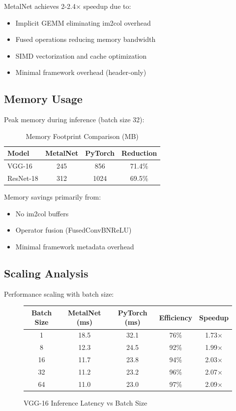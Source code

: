 \documentclass[12pt,oneside,a4paper]{report}
\begin{document}
MetalNet achieves 2-2.4× speedup due to:
\begin{itemize}
    \item Implicit GEMM eliminating im2col overhead
    \item Fused operations reducing memory bandwidth
    \item SIMD vectorization and cache optimization
    \item Minimal framework overhead (header-only)
\end{itemize}

\subsection{Memory Usage}

Peak memory during inference (batch size 32):

\begin{table}[H]
\centering
\caption{Memory Footprint Comparison (MB)}
\begin{tabular}{|l|c|c|c|}
\hline
\textbf{Model} & \textbf{MetalNet} & \textbf{PyTorch} & \textbf{Reduction} \\
\hline
VGG-16 & 245 & 856 & 71.4\% \\
\hline
ResNet-18 & 312 & 1024 & 69.5\% \\
\hline
\end{tabular}
\end{table}

Memory savings primarily from:
\begin{itemize}
    \item No im2col buffers
    \item Operator fusion (FusedConvBNReLU)
    \item Minimal framework metadata overhead
\end{itemize}

\subsection{Scaling Analysis}

Performance scaling with batch size:

\begin{figure}[H]
\centering
\begin{tabular}{|c|c|c|c|c|}
\hline
\textbf{Batch Size} & \textbf{MetalNet (ms)} & \textbf{PyTorch (ms)} & \textbf{Efficiency} & \textbf{Speedup} \\
\hline
1 & 18.5 & 32.1 & 76\% & 1.73× \\
\hline
8 & 12.3 & 24.5 & 92\% & 1.99× \\
\hline
16 & 11.7 & 23.8 & 94\% & 2.03× \\
\hline
32 & 11.2 & 23.2 & 96\% & 2.07× \\
\hline
64 & 11.0 & 23.0 & 97\% & 2.09× \\
\hline
\end{tabular}
\caption{VGG-16 Inference Latency vs Batch Size}
\end{figure}
\end{document}
